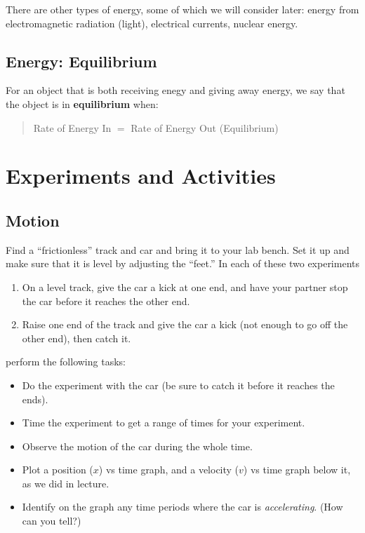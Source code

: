 There are other types of energy, some of which we will consider later: energy from electromagnetic radiation (light), electrical currents, nuclear energy.

\subsection{Energy: Equilibrium}

For an object that is both receiving enegy and giving away energy, we say that the object is in {\bf equilibrium} when:
	\begin{quote}
	Rate of Energy In $=$ Rate of Energy Out  \hspace{1cm} (Equilibrium)
	\end{quote}
	

\section{Experiments and Activities}


\subsection{Motion}

Find a ``frictionless'' track and car and bring it to your lab bench.  Set it up and make sure that it is level by adjusting the ``feet.''  In each of these two experiments
	\begin{enumerate}
	\item On a level track, give the car a kick at one end, and have your partner stop the car before it reaches the other end.
	\item Raise one end of the track and give the car a kick (not enough to go off the other end), then catch it.
	\end{enumerate}
	perform the following tasks:
	\begin{itemize}
	\item Do the experiment with the car (be sure to catch it before it reaches the ends).
	\item Time the experiment to get a range of times for your experiment.
	\item Observe the motion of the car during the whole time.
	\item Plot a position ($x$) vs time graph, and a velocity ($v$) vs time graph below it, as we did in lecture.
	\item Identify on the graph any time periods where the car is {\em accelerating}.  (How can you tell?)
	\end{itemize}

